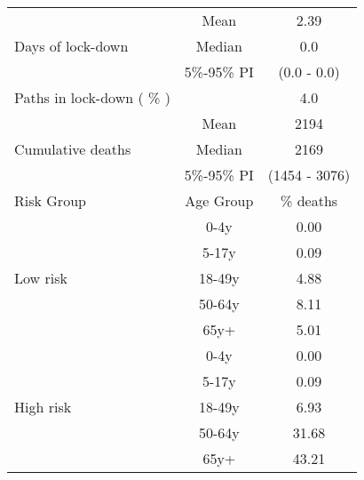 \documentclass{article}
\begin{document}
\begin{table}[th]
\centering
\begin{tabular}{p{4cm}cc}
\toprule
\multirow{3}{*}{Days   of lock-down} & Mean      & 2.39                        \\ \cmidrule(l){2-3} 
                                     & Median    & 0.0                      \\ \cmidrule(l){2-3} 
                                     & 5\%-95\% PI & (0.0 - 0.0)       \\ \midrule 
\multirow{1}{*}{Paths in lock-down ( \% )} &      &         4.0              \\   \midrule                     
\multirow{3}{\hsize}{Cumulative deaths}       & Mean      & 2194 \\ \cmidrule(l){2-3} 
                                     & Median    & 2169                        \\ \cmidrule(l){2-3} 
                                     & 5\%-95\% PI & (1454 - 3076)           \\  \midrule
Risk Group                           & Age Group & \multicolumn{1}{c}{\% deaths}        \\  \midrule
\multirow{5}{*}{Low   risk}          & 0-4y      & 0.00                         \\ \cmidrule(l){2-3} 
                                     & 5-17y     & 0.09                         \\ \cmidrule(l){2-3} 
                                     & 18-49y    & 4.88                         \\ \cmidrule(l){2-3} 
                                     & 50-64y    & 8.11                         \\ \cmidrule(l){2-3} 
                                     & 65y+      & 5.01                         \\ \midrule
\multirow{5}{*}{High   risk}         & 0-4y      & 0.00                         \\ \cmidrule(l){2-3} 
                                     & 5-17y     & 0.09                         \\ \cmidrule(l){2-3} 
                                     & 18-49y    & 6.93                         \\ \cmidrule(l){2-3} 
                                     & 50-64y    & 31.68                         \\ \cmidrule(l){2-3} 
                                     & 65y+      & 43.21                         \\ \midrule

\end{tabular}
\end{table}
\end{document}
